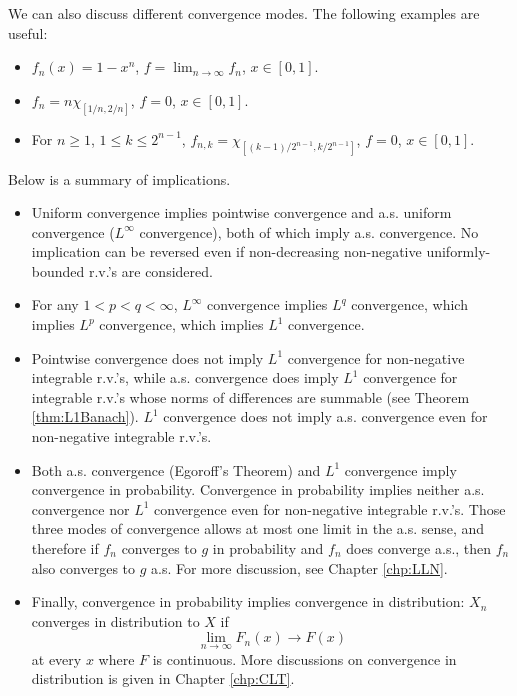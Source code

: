 \documentclass[openany]{book}
\theoremstyle{definition}
\theoremstyle{remark}
\begin{document}
We can also discuss different convergence modes. The following examples are useful:
\begin{itemize}
    \item $f_n(x)=1-x^n$, $f=\lim_{n\to\infty}f_n$, $x\in[0,1]$.
    \item $f_n=n\chi_{[1/n,2/n]}$, $f=0$, $x\in[0,1]$.
    \item For $n\ge1$, $1\le k\le 2^{n-1}$, $f_{n,k}=\chi_{[(k-1)/2^{n-1},k/2^{n-1}]}$, $f=0$, $x\in[0,1]$.
\end{itemize}
Below is a summary of implications.
\begin{itemize}
    \item Uniform convergence implies pointwise convergence and a.s. uniform convergence ($L^{\infty}$ convergence), both of which imply a.s. convergence. No implication can be reversed even if non-decreasing non-negative uniformly-bounded r.v.'s are considered.

    \item For any $1<p<q<\infty$, $L^{\infty}$ convergence implies $L^q$ convergence, which implies $L^p$ convergence, which implies $L^1$ convergence.

    \item Pointwise convergence does not imply $L^1$ convergence for non-negative integrable r.v.'s, while a.s. convergence does imply $L^1$ convergence for integrable r.v.'s whose norms of differences are summable (see Theorem \ref{thm:L1Banach}). $L^1$ convergence does not imply a.s. convergence even for non-negative integrable r.v.'s.

    \item Both a.s. convergence (Egoroff's Theorem) and $L^1$ convergence imply convergence in probability. Convergence in probability implies neither a.s. convergence nor $L^1$ convergence even for non-negative integrable r.v.'s. Those three modes of convergence allows at most one limit in the a.s. sense, and therefore if $f_n$ converges to $g$ in probability and $f_n$ does converge a.s., then $f_n$ also converges to $g$ a.s. For more discussion, see Chapter \ref{chp:LLN}.

    \item Finally, convergence in probability implies convergence in distribution: $X_n$ converges in distribution to $X$ if
    \begin{equation*}
        \lim_{n\to\infty}F_n(x)\to F(x)
    \end{equation*}
    at every $x$ where $F$ is continuous. More discussions on convergence in distribution is given in Chapter \ref{chp:CLT}.
\end{itemize}
\end{document}
